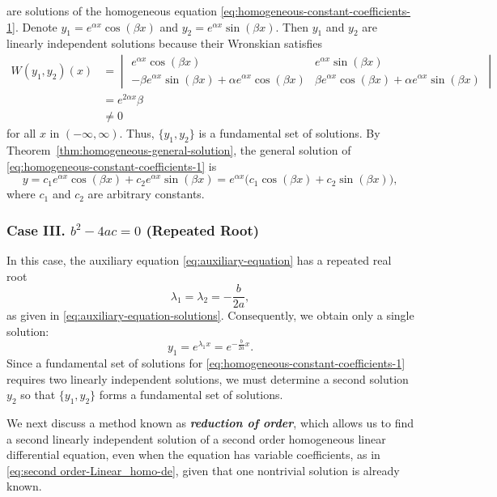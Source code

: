  are solutions of the homogeneous equation \eqref{eq:homogeneous-constant-coefficients-1}. 
 Denote \(y_1=e^{\alpha x} \cos(\beta x)\) and \(y_2=e^{\alpha x} \sin(\beta x).\)
  Then  \(y_1\) and \(y_2\) are  linearly independent  solutions because their Wronskian satisfies
 \[\begin{split}
W(y_1,y_2)(x) &= \begin{vmatrix}
 	e^{\alpha x} \cos(\beta x)&e^{\alpha x} \sin(\beta x)\\
 	-\beta e^{\alpha x} \sin(\beta x) +\alpha e^{\alpha x} \cos(\beta x) &\beta e^{\alpha x} \cos(\beta x) +\alpha e^{\alpha x} \sin(\beta x)
 \end{vmatrix}\\
 	&=e^{2\alpha x} \beta\\
 	&\ne 0
 	 \end{split} \]
 for all \(x\) in \((-\infty, \infty)\). Thus,  \(\{y_1, y_2\}\) is a fundamental set of solutions.  By Theorem~\ref{thm:homogeneous-general-solution}, the general solution of \eqref{eq:homogeneous-constant-coefficients-1} is 
 \begin{equation}\label{eq:complex-general-solution}
 	\boxed{y = c_1e^{\alpha x} \cos(\beta x)+c_2e^{\alpha x} \sin(\beta x) = e^{\alpha x} \big(c_1\cos(\beta x)+c_2 \sin(\beta x)\big),}
 \end{equation}
 where $c_1$ and $c_2$ are arbitrary constants.
 
 \subsubsection{Case III. \(b^2-4ac=0\) (Repeated Root)}
 
 In this case, the auxiliary equation \eqref{eq:auxiliary-equation} has a repeated real root 
 \[
 \lambda_1 = \lambda_2 = -\frac{b}{2a},
 \] 
 as given in \eqref{eq:auxiliary-equation-solutions}. Consequently, we obtain only a single solution:
 \[
 y_1 = e^{\lambda_1 x} = e^{-\frac{b}{2a}x}.
 \] 
 Since a fundamental set of solutions for \eqref{eq:homogeneous-constant-coefficients-1} requires two linearly independent solutions, we must determine a second solution \(y_2\) so that \(\{y_1, y_2\}\) forms a  fundamental set of solutions. 
 
We next discuss a method known as \textbf{\textit{reduction of order}},\label{page:reduction-of-order}  which allows us to find a second linearly independent solution of a second order  homogeneous linear differential equation, even when the equation has variable coefficients, as in \eqref{eq:second order-Linear_homo-de}, given that one nontrivial solution is already known.

